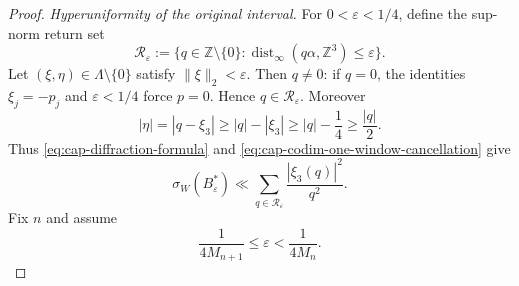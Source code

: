 \documentclass[11pt,reqno,a4paper]{amsart}
\numberwithin{equation}{section}
\theoremstyle{compact}
\theoremstyle{definition}
\theoremstyle{definition}
\begin{document}
\begin{proof}
\smallskip\noindent\emph{Hyperuniformity of the original interval.}
For
$0<\varepsilon<1/4$, define the sup-norm return set
\begin{equation}\label{eq:cap-codim-one-return-set}
  \mathcal R_\varepsilon
  :=\{q\in\mathbb Z\setminus\{0\}:
       \operatorname{dist}_\infty(q\alpha,\mathbb Z^3)\leq\varepsilon\}.
\end{equation}
Let $(\xi,\eta)\in\Lambda\setminus\{0\}$ satisfy
$\|\xi\|_2<\varepsilon$.  Then $q\neq0$: if $q=0$, the identities
$\xi_j=-p_j$ and $\varepsilon<1/4$ force $p=0$.  Hence
$q\in\mathcal R_\varepsilon$.  Moreover
\[
  |\eta|=|q-\xi_3|
  \geq |q|-|\xi_3|
  \geq |q|-\frac14
  \geq\frac{|q|}{2}.
\]
Thus \eqref{eq:cap-diffraction-formula} and
\eqref{eq:cap-codim-one-window-cancellation} give
\begin{equation}\label{eq:cap-codim-one-hu1-sum}
  \sigma_W(B_\varepsilon^*)
  \ll
  \sum_{q\in\mathcal R_\varepsilon}
    \frac{|\xi_3(q)|^2}{q^2}.
\end{equation}
Fix $n$ and assume
\begin{equation}\label{eq:cap-codim-one-epsilon-scale}
  \frac1{4M_{n+1}}\leq\varepsilon<\frac1{4M_n}.
\end{equation}


\end{proof}
\end{document}
